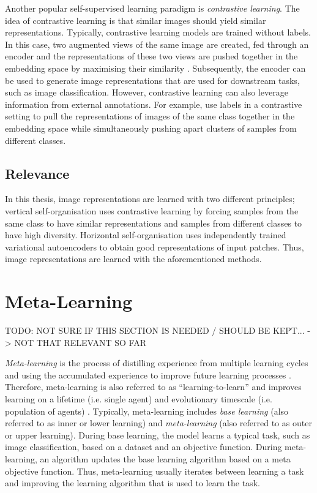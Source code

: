 Another popular self-supervised learning paradigm is \emph{contrastive learning}.
The idea of contrastive learning is that similar images should yield similar representations.
Typically, contrastive learning models are trained without labels.
In this case, two augmented views of the same image are created, fed through an encoder and the representations of these two views are pushed together in the embedding space by maximising their similarity .
Subsequently, the encoder can be used to generate image representations that are used for downstream tasks, such as image classification.
However, contrastive learning can also leverage information from external annotations.
For example,  use labels in a contrastive setting to pull the representations of images of the same class together in the embedding space while simultaneously pushing apart clusters of samples from different classes.

\subsection{Relevance}
In this thesis, image representations are learned with two different principles;
vertical self-organisation uses contrastive learning by forcing samples from the same class to have similar representations and samples from different classes to have high diversity.
Horizontal self-organisation uses independently trained variational autoencoders to obtain good representations of input patches.
Thus, image representations are learned with the aforementioned methods.


\section{Meta-Learning}
TODO: NOT SURE IF THIS SECTION IS NEEDED / SHOULD BE KEPT... -> NOT THAT RELEVANT SO FAR

\emph{Meta-learning} is the process of distilling experience from multiple learning cycles and using the accumulated experience to improve future learning processes .
Therefore, meta-learning is also referred to as ``learning-to-learn''  and improves learning on a lifetime (i.e. single agent) and evolutionary timescale (i.e. population of agents) .
Typically, meta-learning includes \emph{base learning} (also referred to as inner or lower learning) and \emph{meta-learning} (also referred to as outer or upper learning).
During base learning, the model learns a typical task, such as image classification, based on a dataset and an objective function.
During meta-learning, an algorithm updates the base learning algorithm based on a meta objective function.
Thus, meta-learning usually iterates between learning a task and improving the learning algorithm that is used to learn the task.

